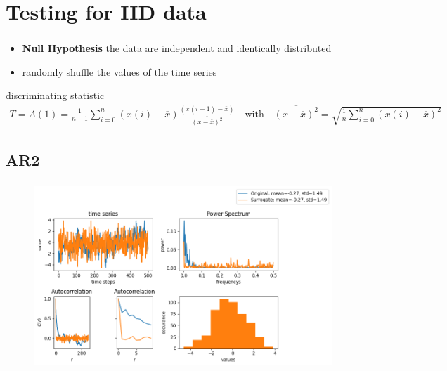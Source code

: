 \section{Testing for IID data}
\begin{frame}
  \frametitle{\insertsectionhead}
  \framesubtitle{\insertsubsectionhead}
\begin{itemize}
  \item \textbf{Null Hypothesis} the data are independent and identically distributed
  \item randomly shuffle the values of the time series
\end{itemize}
discriminating statistic
\begin{gather*}
  T = A(1) = \frac{1}{n-1} \sum_{i=0}^{n}(x(i)-\overline{x})\frac{(x(i+1)-\overline{x})}{\overline{(x-\overline{x})^2}} \quad \text{with} \quad \overline{(x-\overline{x})^2} = \sqrt{\frac{1}{n}\sum_{i=0}^n (x(i)-\overline{x})^2}
\end{gather*}
\end{frame}


\subsection{AR2}
\begin{frame}
  \frametitle{\insertsectionhead}
  \framesubtitle{\insertsubsectionhead}
\begin{figure}
  \centering
  \includegraphics[height=0.8\textheight]{figs/IID_ar2.png}
\end{figure}
\end{frame}

